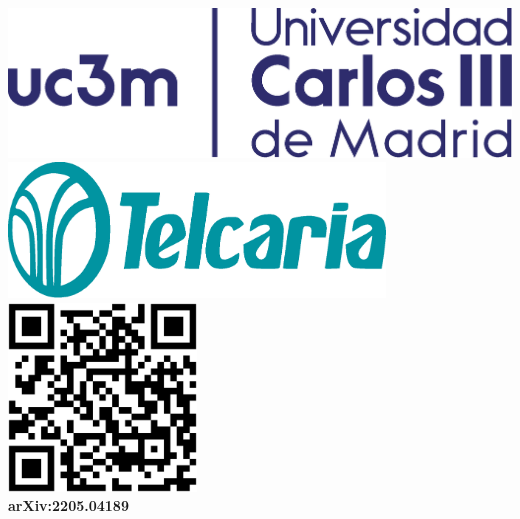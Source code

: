 \documentclass[a0,portrait]{a0poster}
\begin{document}
\begin{minipage}[b]{0.25\linewidth}
\color{DarkSlateGray} %
    \includegraphics[width=15cm]{logo-uc3m.eps}
    \hspace*{2cm}\includegraphics[width=10cm]{logo-telcaria.eps}\vspace{1cm}
    \hspace*{5cm}\includegraphics[width=5cm]{qr.eps}\\
    \hspace*{3.31cm}\large \textbf{arXiv:2205.04189}\\[0.1cm]
\end{minipage}

\vspace{1cm} %







\color{DarkSlateGray} %
\end{document}
